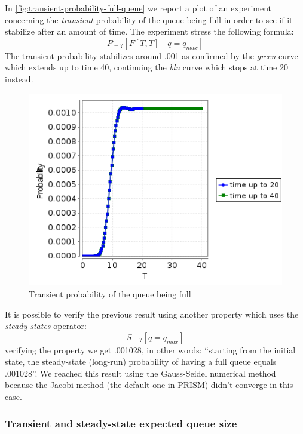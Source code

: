 In \autoref{fig:transient-probability-full-queue} we report a plot of
an experiment concerning the \emph{transient} probability of the queue
being full in order to see if it stabilize after an amount of
time. The experiment stress the following formula:
\begin{displaymath}
  P_{=?} [ F[T,T]\quad q=q_{max} ]
\end{displaymath}
The transient probability stabilizes around .001 as confirmed by the
\emph{green} curve which extends up to time 40, continuing the
\emph{blu} curve which stops at time 20 instead.
\begin{figure}[htb]
  \centering
  \includegraphics[width=13cm]{quantitative-project/transient-probability-full-queue.png}
  \caption{Transient probability of the queue being full}
  \label{fig:transient-probability-full-queue}
\end{figure}
It is possible to verify the previous result using another property
which uses the \emph{steady states} operator:
\begin{displaymath}
S_{=?} [ q=q_{max} ]
\end{displaymath}
verifying the property we get .001028, in other words: ``starting from
the initial state, the steady-state (long-run) probability of having a
full queue equals .001028''. We reached this result using the
Gauss-Seidel numerical method because the Jacobi method (the default
one in PRISM) didn't converge in this case.

\subsubsection{Transient and steady-state expected queue size}

